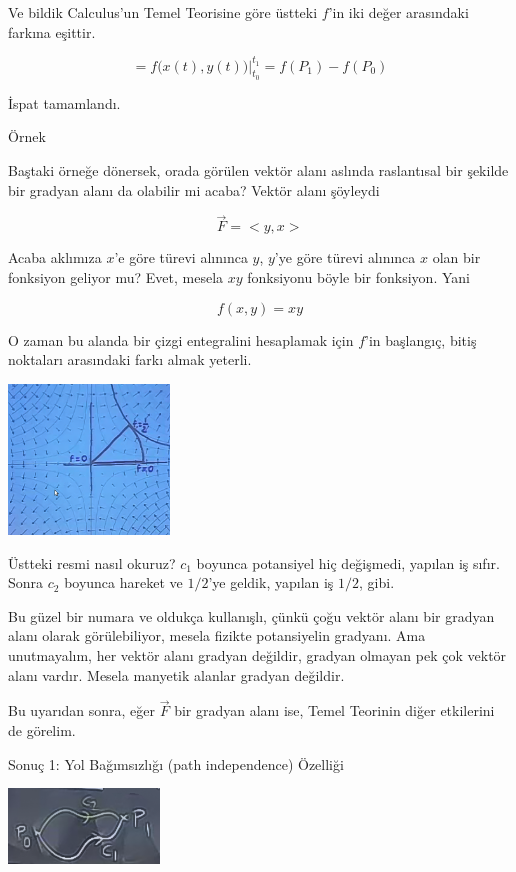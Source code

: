 \documentclass[12pt,fleqn]{article}\usepackage{../../common}
\begin{document}
Ve bildik Calculus'un Temel Teorisine göre üstteki $f$'in iki değer
arasındaki farkına eşittir. 

$$
= f\bigg( x(t), y(t) \bigg) \bigg|_{t_0}^{t_1} = f(P_1) - f(P_0)
$$

İspat tamamlandı. 

Örnek

Baştaki örneğe dönersek, orada görülen vektör alanı aslında raslantısal bir
şekilde bir gradyan alanı da olabilir mi acaba? Vektör alanı şöyleydi

$$ \vec{F} = <y,x> $$

Acaba aklımıza $x$'e göre türevi alınınca $y$, $y$'ye göre türevi alınınca
$x$ olan bir fonksiyon geliyor mu? Evet, mesela $xy$ fonksiyonu böyle bir
fonksiyon. Yani

$$ f(x,y) = xy $$

O zaman bu alanda bir çizgi entegralini hesaplamak için $f$'in başlangıç,
bitiş noktaları arasındaki farkı almak yeterli. 

\begin{center}
\includegraphics[height=4cm]{20_6.png}
\end{center}

Üstteki resmi nasıl okuruz? $c_1$ boyunca potansiyel hiç değişmedi, yapılan iş
sıfır. Sonra $c_2$ boyunca hareket ve $1/2$'ye geldik, yapılan iş $1/2$, gibi.

Bu güzel bir numara ve oldukça kullanışlı, çünkü çoğu vektör alanı bir
gradyan alanı olarak görülebiliyor, mesela fizikte potansiyelin
gradyanı. Ama unutmayalım, her vektör alanı gradyan değildir, gradyan
olmayan pek çok vektör alanı vardır. Mesela manyetik alanlar gradyan
değildir. 

Bu uyarıdan sonra, eğer $\vec{F}$ bir gradyan alanı ise, Temel Teorinin
diğer etkilerini de görelim. 

Sonuç 1: Yol Bağımsızlığı (path independence) Özelliği

\begin{center}
\includegraphics[height=2cm]{20_7.png}
\end{center}
\end{document}
